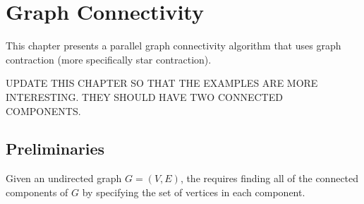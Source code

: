 \chapter{Graph Connectivity}
\label{ch:graphcon::connect}

\begin{preamble}
This chapter presents a parallel graph connectivity algorithm that
uses graph contraction (more specifically star contraction). 
\end{preamble}

\begin{teachnote}
UPDATE THIS CHAPTER SO THAT THE EXAMPLES ARE MORE INTERESTING.  THEY SHOULD HAVE TWO CONNECTED COMPONENTS.
\end{teachnote}

\section{Preliminaries}
\label{sec:graphcon::connect::prelim}

\begin{definition}
\label{def:graphcon::connect::problem}
Given an undirected graph $G = (V,E)$, the  requires finding all of the connected components of $G$ by
specifying the set of vertices in each component.
\end{definition}
%

